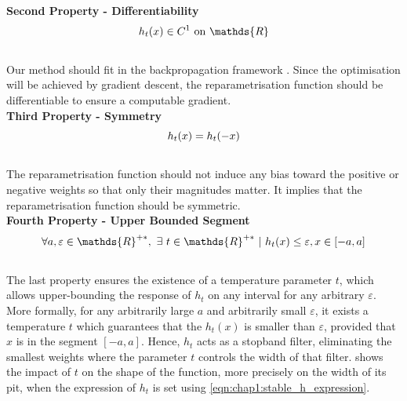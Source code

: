 \noindent\textbf{Second Property - Differentiability} \\
\begin{equation}
    \centering
    h_t(x) \in C^1 \text{ on } \mathds{R}
    \label{eqn:chap1:reparam_prop2}
\end{equation}
\\
Our method should fit in the backpropagation framework \cite{rumelhart1986learning}. Since the optimisation will
be achieved by gradient descent, the reparametrisation function should be
differentiable to ensure a computable gradient.\\

\noindent\textbf{Third Property - Symmetry} \\

\begin{equation}
    \centering
    h_t(x) = h_t(-x)
    \label{eqn:chap1:reparam_prop3}
\end{equation}
\\
The reparametrisation function should not induce any bias toward the positive or
negative weights so that only their magnitudes matter. It implies that the
reparametrisation function should be symmetric.\\


\noindent\textbf{Fourth Property - Upper Bounded Segment} \\

\begin{equation}
    \centering
    \forall a,\varepsilon \in\mathds{R}^{+\ast},~ \exists ~t
    \in\mathds{R}^{+\ast} ~ | ~ h_t(x) \leq \varepsilon, x \in [-a,a]
    \label{eqn:chap1:reparam_prop4}
\end{equation}
\\
The last property ensures the existence of a temperature parameter $t$, which
allows upper-bounding the response of $h_t$ on any interval for any arbitrary
$\varepsilon$. More formally, for any arbitrarily large $a$ and arbitrarily
small $\varepsilon$, it exists a temperature $t$ which guarantees that the
$h_t(x)$ is smaller than $\varepsilon$, provided that $x$ is in the segment
$[-a, a]$. Hence, $h_t$ acts as a stopband filter, eliminating the smallest
weights where the parameter $t$ controls the width of that filter.
 shows the impact of $t$ on the shape of
the function, more precisely on the width of its pit, when the expression of
$h_t$ is set using \cref{eqn:chap1:stable_h_expression}.\\

